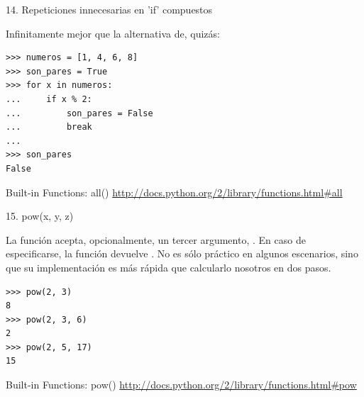 \documentclass[14pt]{beamer}
\begin{document}
\begin{frame}[fragile]
  {14. \normalsize Repeticiones innecesarias en 'if' compuestos}
  \begin{alertblock}{}
    \centering
    Infinitamente mejor que la alternativa de, quizás:
  \end{alertblock}

  \footnotesize
  \begin{exampleblock}{}
    \begin{lstlisting}
>>> numeros = [1, 4, 6, 8]
>>> son_pares = True
>>> for x in numeros:
...     if x % 2:
...         son_pares = False
...         break
...
>>> son_pares
False
    \end{lstlisting}
  \end{exampleblock}

  \small
  \begin{block}
    {\centering Built-in Functions: all()}
    \centering \url{http://docs.python.org/2/library/functions.html\#all}
  \end{block}
\end{frame}

\begin{frame}[fragile]{15. pow(x, y, z)}
  \small
  \begin{block}{}
    \centering
    La función  acepta, opcionalmente, un tercer
    argumento, . En caso de especificarse, la función
    devuelve .  No es sólo práctico en
    algunos escenarios, sino que su implementación es más rápida que
    calcularlo nosotros en dos pasos.
  \end{block}

  \footnotesize
  \begin{exampleblock}{}
    \begin{lstlisting}
>>> pow(2, 3)
8
>>> pow(2, 3, 6)
2
>>> pow(2, 5, 17)
15
    \end{lstlisting}
  \end{exampleblock}

  \small
  \begin{block}
    {\centering Built-in Functions: pow()}
    \centering \url{http://docs.python.org/2/library/functions.html\#pow}
  \end{block}
\end{frame}
\end{document}
